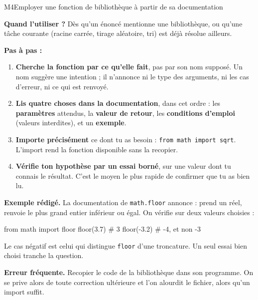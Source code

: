 \begin{fichemethode}{M4}{Employer une fonction de bibliothèque à partir de sa documentation}

\textbf{Quand l'utiliser ?} Dès qu'un énoncé mentionne une bibliothèque, ou qu'une tâche
courante (racine carrée, tirage aléatoire, tri) est déjà résolue ailleurs.

\textbf{Pas à pas :}
\begin{enumerate}
  \item \textbf{Cherche la fonction par ce qu'elle fait}, pas par son nom supposé. Un nom
        suggère une intention ; il n'annonce ni le type des arguments, ni les cas d'erreur,
        ni ce qui est renvoyé.
  \item \textbf{Lis quatre choses dans la documentation}, dans cet ordre : les
        \textbf{paramètres} attendus, la \textbf{valeur de retour}, les \textbf{conditions
        d'emploi} (valeurs interdites), et un \textbf{exemple}.
  \item \textbf{Importe précisément} ce dont tu as besoin : \lstinline{from math import sqrt}.
        L'import rend la fonction disponible sans la recopier.
  \item \textbf{Vérifie ton hypothèse par un essai borné}, sur une valeur dont tu connais le
        résultat. C'est le moyen le plus rapide de confirmer que tu as bien lu.
\end{enumerate}

\textbf{Exemple rédigé.} La documentation de \lstinline{math.floor} annonce : prend un réel,
renvoie le plus grand entier inférieur ou égal. On vérifie sur deux valeurs choisies :

\begin{python}
from math import floor
floor(3.7)    # 3
floor(-3.2)   # -4, et non -3
\end{python}

Le cas négatif est celui qui distingue \lstinline{floor} d'une troncature. Un seul essai bien
choisi tranche la question.

\textbf{Erreur fréquente.} Recopier le code de la bibliothèque dans son programme. On se prive
alors de toute correction ultérieure et l'on alourdit le fichier, alors qu'un import suffit.

\end{fichemethode}
